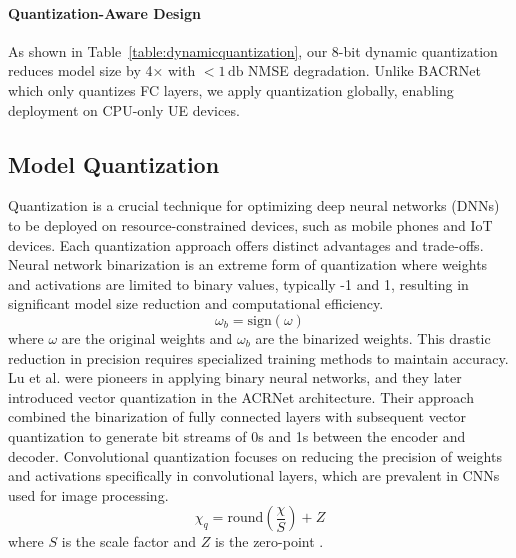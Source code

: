 \documentclass[lettersize,journal]{IEEEtran}
\begin{document}
\paragraph{Quantization-Aware Design} 
As shown in Table~\ref{table:dynamicquantization}, our 8-bit dynamic quantization reduces model size by 4× with $< 1\,\text{db} $ NMSE degradation. Unlike BACRNet \cite{abx} which only quantizes FC layers, we apply quantization globally, enabling deployment on CPU-only UE devices.


\subsection{Model Quantization}
Quantization is a crucial technique for optimizing deep neural networks (DNNs) to be deployed on resource-constrained devices, such as mobile phones and IoT devices. Each quantization approach offers distinct advantages and trade-offs. Neural network binarization is an extreme form of quantization where weights and activations are limited to binary values, typically -1 and 1, resulting in significant model size reduction and computational efficiency. 
\begin{equation}
	\omega_{b}=\mathrm{sign}(\omega)
\end{equation}
where \begin{math}
	\omega
\end{math}
are the original weights and \begin{math} \omega_{b}\end{math} are the binarized weights. This drastic reduction in precision requires specialized training methods to maintain accuracy. \cite{aaa1} Lu et al. \cite{abp} were pioneers in applying binary neural networks, and they later introduced vector quantization in the ACRNet \cite{abx} architecture. Their approach combined the binarization of fully connected layers with subsequent vector quantization to generate bit streams of 0s and 1s between the encoder and decoder. Convolutional quantization focuses on reducing the precision of weights and activations specifically in convolutional layers, which are prevalent in CNNs used for image processing. 
\begin{equation}
	\chi_{q}=\mathrm{round}(\frac{\chi}{S})+Z
\end{equation}
where \begin{math}
	S
\end{math} is the scale factor and \begin{math}
Z
\end{math} is the zero-point \cite{convolutionalquantization}. 
\end{document}
